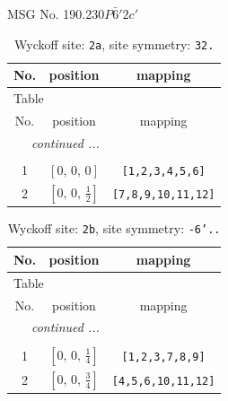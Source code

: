 \documentclass[fleqn,8pt]{jsarticle}
\begin{document}
\setcounter{MaxMatrixCols}{32}

\renewcommand{\tablename}{Table~}
\renewcommand{\figurename}{Figure~}
\begin{center}
\LARGE
MSG No. 190.230\quad$P\bar{6}'2c'$
\end{center}
\renewcommand{\arraystretch}{1.2}
\begin{longtable}{ccc}
\caption{Wyckoff site: {\tt 2a}, site symmetry: {\tt 32.}}
 \\
 \hline \hline
No. & position & mapping \\ \hline \endfirsthead

\multicolumn{2}{l}{\tablename\ \thetable{}} \\
 \hline \hline
No. & position & mapping \\ \hline \endhead

 \hline \hline
\multicolumn{2}{r}{\footnotesize\it continued ...} \\ \endfoot

 \hline \hline
\multicolumn{2}{r}{} \\ \endlastfoot

1 & $\left[ 0,\, 0,\, 0 \right]$ & {\tt [1,2,3,4,5,6]} \\ \hline
2 & $\left[ 0,\, 0,\, \frac{1}{2} \right]$ & {\tt [7,8,9,10,11,12]} \\
\end{longtable}
\renewcommand{\arraystretch}{1.2}
\begin{longtable}{ccc}
\caption{Wyckoff site: {\tt 2b}, site symmetry: {\tt -6'..}}
 \\
 \hline \hline
No. & position & mapping \\ \hline \endfirsthead

\multicolumn{2}{l}{\tablename\ \thetable{}} \\
 \hline \hline
No. & position & mapping \\ \hline \endhead

 \hline \hline
\multicolumn{2}{r}{\footnotesize\it continued ...} \\ \endfoot

 \hline \hline
\multicolumn{2}{r}{} \\ \endlastfoot

1 & $\left[ 0,\, 0,\, \frac{1}{4} \right]$ & {\tt [1,2,3,7,8,9]} \\ \hline
2 & $\left[ 0,\, 0,\, \frac{3}{4} \right]$ & {\tt [4,5,6,10,11,12]} \\
\end{longtable}
\end{document}
